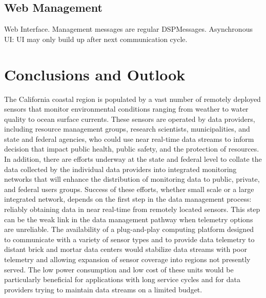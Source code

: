 \documentclass[conference]{IEEEtran}
\begin{document}
\subsection{Web Management}

Web Interface. Management messages are regular
DSPMessages. Asynchronous UI: UI may only build up after next
communication cycle.

\section{Conclusions and Outlook}

The California coastal region is populated by a vast number of
remotely deployed sensors that monitor environmental conditions
ranging from weather to water quality to ocean surface currents.
These sensors are operated by data providers, including resource
management groups, research scientists, municipalities, and state and
federal agencies, who could use near real-time data streams to inform
decision that impact public health, public safety, and the protection
of resources.  In addition, there are efforts underway at the state
and federal level to collate the data collected by the individual data
providers into integrated monitoring networks that will enhance the
distribution of monitoring data to public, private, and federal users
groups.  Success of these efforts, whether small scale or a large
integrated network, depends on the first step in the data management
process: reliably obtaining data in near real-time from remotely
located sensors.  This step can be the weak link in the data
management pathway when telemetry options are unreliable.  The
availability of a plug-and-play computing platform designed to
communicate with a variety of sensor types and to provide data
telemetry to distant brick and mortar data centers would stabilize
data streams with poor telemetry and allowing expansion of sensor
coverage into regions not presently served.  The low power consumption
and low cost of these units would be particularly beneficial for
applications with long service cycles and for data providers trying to
maintain data streams on a limited budget.



\end{document}
